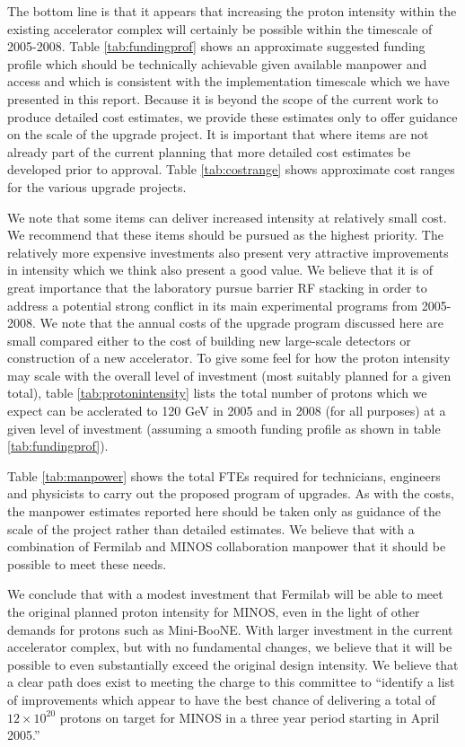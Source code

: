 \documentclass{article}
\begin{document}
The bottom line is that it appears that increasing the proton intensity
within the existing accelerator complex will certainly be possible within
the timescale of 2005-2008. Table \ref {tab:fundingprof} shows an
approximate suggested
funding profile which should be technically achievable given available
manpower and access and which is consistent with the implementation
timescale which we have presented in this report. Because it is beyond the
scope of the current work to produce detailed cost estimates, we provide
these estimates only to offer guidance on the scale of the upgrade project.
It is important that where items are not already part of the current planning
that more detailed cost estimates be developed prior to approval.
Table \ref {tab:costrange} shows approximate cost 
ranges for the various upgrade projects.

We note that some items can deliver increased intensity
at relatively small cost. We recommend that these items should be pursued
as the highest priority. The relatively more expensive investments also
present very attractive improvements in intensity which we think also 
present a good value. We believe that it is of great importance that the
laboratory pursue barrier RF stacking in order to address a potential
strong conflict in its main experimental programs from 2005-2008.
We note that the annual costs of the upgrade program
discussed here are small compared either to the cost of building new 
large-scale detectors or construction of a new accelerator. To give some
feel for how the proton intensity may scale with the overall level of 
investment (most suitably planned for a given total), table 
\ref {tab:protonintensity} lists the total number of protons which we
expect can be acclerated to 120 GeV in 2005 and in 2008 (for all purposes)
at a given level of investment (assuming a smooth funding profile as shown
in table \ref {tab:fundingprof}).  


Table \ref {tab:manpower} shows the 
total FTEs required for technicians, engineers and physicists to carry out
the proposed program of upgrades. As with the costs, the manpower estimates
reported here should be taken only as guidance of the scale of the project
rather than detailed estimates.
We believe that with a combination of
Fermilab and MINOS collaboration manpower that it should be possible to
meet these needs.

We conclude that with a modest investment that Fermilab will be able to 
meet the original planned 
proton intensity for MINOS, even in the light of other
demands for protons such as Mini-BooNE. With larger investment in the
current accelerator complex, but with no fundamental changes, we believe
that it will be possible to even substantially exceed the original
design intensity. We believe that a clear path does exist to meeting
the charge to this committee to ``identify a list of improvements which
appear to have the best chance of delivering a total of $12\times10^{20}$
protons on target for MINOS in a three year period starting in April 2005.''
\end{document}
